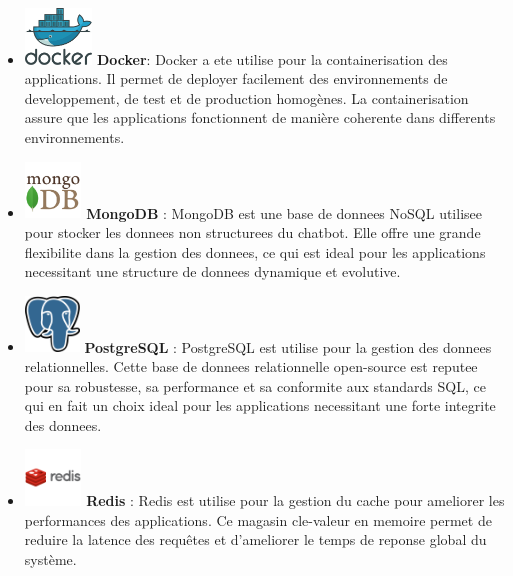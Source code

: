 \documentclass[a4paper, 11pt, openany]{report}
\begin{document}
\begin{itemize}
    \item  \includegraphics[height=1.5cm]{assets/images/docker.png} \hspace{5pt} \textbf{Docker}: 
    Docker a ete utilise pour la containerisation des applications. Il permet de deployer facilement des environnements de developpement, de test et de production homogènes. La containerisation assure que les applications fonctionnent de manière coherente dans differents environnements.

    \item \includegraphics[height=1.5cm]{assets/images/mongo.png} \hspace{5pt} \textbf{MongoDB}  : 
    MongoDB est une base de donnees NoSQL utilisee pour stocker les donnees non structurees du chatbot. Elle offre une grande flexibilite dans la gestion des donnees, ce qui est ideal pour les applications necessitant une structure de donnees dynamique et evolutive.

    \item \includegraphics[height=1.5cm]{assets/images/postgres.png} \hspace{5pt} \textbf{PostgreSQL}  : 
    PostgreSQL est utilise pour la gestion des donnees relationnelles. Cette base de donnees relationnelle open-source est reputee pour sa robustesse, sa performance et sa conformite aux standards SQL, ce qui en fait un choix ideal pour les applications necessitant une forte integrite des donnees.

    \item \includegraphics[height=1.5cm]{assets/images/redis.png} \hspace{5pt} \textbf{Redis} : 
    Redis est utilise pour la gestion du cache pour ameliorer les performances des applications. Ce magasin cle-valeur en memoire permet de reduire la latence des requêtes et d'ameliorer le temps de reponse global du système.


\end{itemize}
\end{document}
